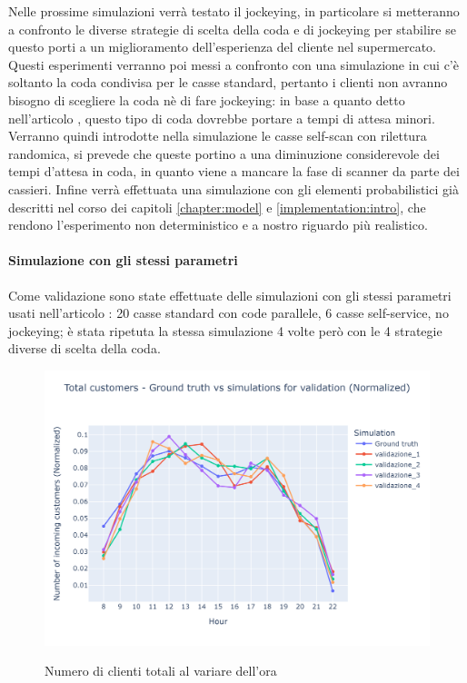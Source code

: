 Nelle prossime simulazioni verrà testato il jockeying, in particolare si metteranno a confronto le diverse strategie di scelta della coda e di jockeying per stabilire se questo porti a un miglioramento dell'esperienza del cliente nel supermercato. Questi esperimenti verranno poi messi a confronto con una simulazione in cui c'è soltanto la coda condivisa per le casse standard, pertanto i clienti non avranno bisogno di scegliere la coda nè di fare jockeying: in base a quanto detto nell'articolo \cite{yanagisawa2011methods}, questo tipo di coda dovrebbe portare a tempi di attesa minori. 
Verranno quindi introdotte nella simulazione le casse self-scan con rilettura randomica, si prevede che queste portino a una diminuzione considerevole dei tempi d'attesa in coda, in quanto viene a mancare la fase di scanner da parte dei cassieri. Infine verrà effettuata una simulazione con gli elementi probabilistici già descritti nel corso dei capitoli \ref{chapter:model} e \ref{implementation:intro}, che rendono l'esperimento non deterministico e a nostro riguardo più realistico.

\paragraph{Simulazione con gli stessi parametri}

Come validazione sono state effettuate delle simulazioni con gli stessi parametri usati nell'articolo \cite{article1}: 20 casse standard con code parallele, 6 casse self-service, no jockeying; è stata ripetuta la stessa simulazione 4 volte però con le 4 strategie diverse di scelta della coda.

\begin{figure}[H]
	\centering
	\includegraphics[width=12cm]{"images/results/total_customers_validation.png"}
	\label{fig:total_customers_validation}
	\caption{Numero di clienti totali al variare dell'ora}
\end{figure}

